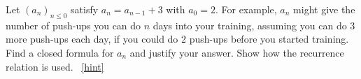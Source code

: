 \documentclass{book}
\begin{document}
\setcounter{project}{143}
\addtocounter{project}{-1}
\begin{activity}[]\label{act-arithmetic}
\hypertarget{p-963}{}%
Let \((a_n)_{n \le 0}\) satisfy \(a_n = a_{n-1} + 3\) with \(a_0 = 2\).  For example, \(a_n\) might give the number of push-ups you can do \(n\) days into your training, assuming you can do 3 more push-ups each day, if you could do 2 push-ups before you started training.  Find a closed formula for \(a_n\) and justify your answer.  Show how the recurrence relation is used.%
~\hfill{\tiny\hyperlink{a-143}{[hint]}\hypertarget{q-143}{}}\end{activity}
\end{document}
